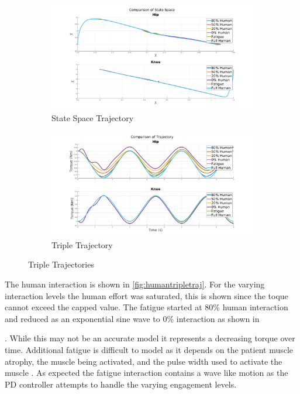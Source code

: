 \begin{figure}
    \centering
    \begin{subfigure}{\linewidth}
        \centering
        \includegraphics[width=\columnwidth]{images/controllers/trajs/statespace.png}
        \caption[State Space Trajectory]{State Space Trajectory}
        \label{fig:StateSpaceTrajectory}
    \end{subfigure}
    \begin{subfigure}{\linewidth}
        \centering
        \includegraphics[width=\columnwidth]{images/controllers/trajs/triple_traj.png}
        \caption[Triple Trajectory]{Triple Trajectory}
        \label{fig:TripleTrajectory}
    \end{subfigure}
    \caption[Triple Trajectory LARRE]{Triple Trajectories}
    \label{fig:TripleTraj}
\end{figure}



The human interaction is shown in \autoref{fig:humantripletraj}. For the varying interaction levels the human effort was saturated, this is shown since the toque cannot exceed the capped value. The fatigue started at 80\% human interaction and reduced as an exponential sine wave to 0\% interaction as shown in \author{fig:fatprofile}. While this may not be an accurate model it represents a decreasing torque over time. Additional fatigue is difficult to model as it depends on the patient muscle atrophy, the muscle being activated, and the pulse width used to activate the muscle \cite{reiner1998patient}. As expected the fatigue interaction contains a wave like motion as the PD controller attempts to handle the varying engagement levels. 


